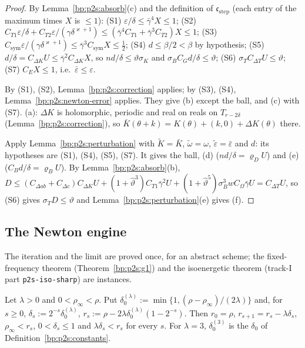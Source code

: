 \begin{proof}
\label{step:p2s:st-small}
By Lemma~\ref{bp:p2s:absorb}(c) and the definition of $\mathfrak c_{\mathrm{step}}$ (each entry of the maximum times $X$ is $\le1$):
(S1) $\varepsilon/\delta\le\bar\gamma^4X\le1$; (S2) $C_{T1}\varepsilon/\delta+C_{T2}\varepsilon/(\gamma\delta^{\varkappa+1})\le(\bar\gamma^4C_{T1}+\bar\gamma^3C_{T2})X\le1$;
(S3) $C_{\mathrm{sym}}\varepsilon/(\gamma\delta^{\varkappa+1})\le\bar\gamma^3C_{\mathrm{sym}}X\le\frac12$; (S4) $d\le\beta/2<\beta$ by hypothesis;
(S5) $d/\delta=C_{\Delta K}U\le\bar\gamma^2C_{\Delta K}X$, so $nd/\delta\le\vartheta\sigma_K$ and $\sigma_BC_Gd/\delta\le\vartheta$;
(S6) $\sigma_TC_{\Delta T}U\le\vartheta$; (S7) $C_EX\le1$, i.e.\ $\bar\varepsilon\le\varepsilon$.

\label{step:p2s:st-err}
By (S1), (S2), Lemma~\ref{bp:p2s:correction} applies; by (S3), (S4), Lemma~\ref{bp:p2s:newton-error} applies. They give (b) except the
ball, and (c) with (S7). (a): $\Delta K$ is holomorphic, periodic and real on reals on $T_{r-2\delta}$ (Lemma~\ref{bp:p2s:correction}), so
$\bar K(\theta+k)=K(\theta)+(k,0)+\Delta K(\theta)$ there.

\label{step:p2s:st-pert}
Apply Lemma~\ref{bp:p2s:perturbation} with $\tilde K=\bar K$, $\tilde\omega=\omega$, $\tilde\varepsilon=\bar\varepsilon$ and $d$: its hypotheses are
(S1), (S4), (S5), (S7). It gives the ball, (d) ($nd/\delta=\varrho_DU$) and (e) ($C_Bd/\delta=\varrho_BU$). By Lemma~\ref{bp:p2s:absorb}(b),
$D\le(C_{\Delta ab}+C_{\Delta c})C_{\Delta K}U+(1+\hat\vartheta^3)C_{T1}\bar\gamma^2U+(1+\hat\vartheta^5)\sigma_B^3wC_\Omega\bar\gamma U=C_{\Delta T}U$, so
(S6) gives $\sigma_TD\le\vartheta$ and Lemma~\ref{bp:p2s:perturbation}(e) gives (f).
\end{proof}

\subsection{The Newton engine}\label{bp:p2s:sec-engine}

The iteration and the limit are proved once, for an abstract scheme; the fixed-frequency theorem
(Theorem~\ref{bp:p2s:g1}) and the isoenergetic theorem (track-I part \texttt{p2s-iso-sharp}) are instances.

\begin{definition}\label{bp:p2s:schedule}
Let $\lambda>0$ and $0<\rho_\infty<\rho$. Put $\delta_0^{(\lambda)}:=\min\{1,(\rho-\rho_\infty)/(2\lambda)\}$ and, for $s\ge0$,
$\delta_s:=2^{-s}\delta_0^{(\lambda)}$, $r_s:=\rho-2\lambda\delta_0^{(\lambda)}(1-2^{-s})$. Then $r_0=\rho$, $r_{s+1}=r_s-\lambda\delta_s$, $\rho_\infty<r_s$,
$0<\delta_s\le1$ and $\lambda\delta_s<r_s$ for every $s$. For $\lambda=3$, $\delta_0^{(3)}$ is the $\delta_0$ of
Definition~\ref{bp:p2s:constants}.
\end{definition}


